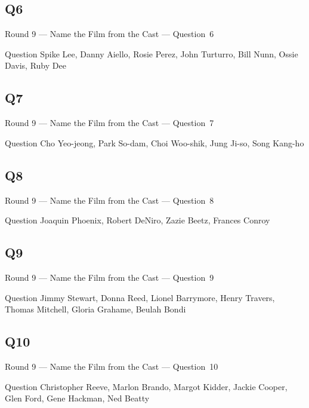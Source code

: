 \documentclass[11pt]{beamer}
\begin{document}
\subsection*{Q6}
\begin{frame}[t]{Round 9 --- Name the Film from the Cast --- \mbox{Question 6}}
\vspace{-0.5em}
\begin{block}{Question}
Spike Lee, Danny Aiello, Rosie Perez, John Turturro, Bill Nunn, Ossie Davis, Ruby Dee
\end{block}
\end{frame}
\subsection*{Q7}
\begin{frame}[t]{Round 9 --- Name the Film from the Cast --- \mbox{Question 7}}
\vspace{-0.5em}
\begin{block}{Question}
Cho Yeo-jeong, Park So-dam, Choi Woo-shik, Jung Ji-so, Song Kang-ho
\end{block}
\end{frame}
\subsection*{Q8}
\begin{frame}[t]{Round 9 --- Name the Film from the Cast --- \mbox{Question 8}}
\vspace{-0.5em}
\begin{block}{Question}
Joaquin Phoenix, Robert DeNiro, Zazie Beetz, Frances Conroy
\end{block}
\end{frame}
\subsection*{Q9}
\begin{frame}[t]{Round 9 --- Name the Film from the Cast --- \mbox{Question 9}}
\vspace{-0.5em}
\begin{block}{Question}
Jimmy Stewart, Donna Reed, Lionel Barrymore, Henry Travers,  Thomas Mitchell, Gloria Grahame, Beulah Bondi
\end{block}
\end{frame}
\subsection*{Q10}
\begin{frame}[t]{Round 9 --- Name the Film from the Cast --- \mbox{Question 10}}
\vspace{-0.5em}
\begin{block}{Question}
Christopher Reeve, Marlon Brando, Margot Kidder, Jackie Cooper, Glen Ford, Gene Hackman, Ned Beatty
\end{block}
\end{frame}
\end{document}
